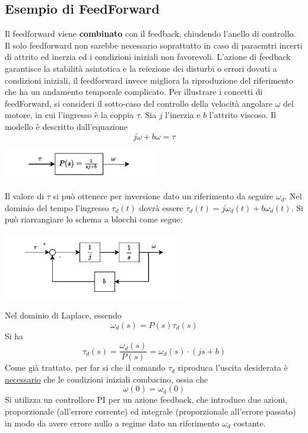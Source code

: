 \documentclass[10pt, letterpaper]{report}
\begin{document}
\subsection{Esempio di FeedForward}
Il feedforward viene \textbf{combinato} con il feedback, chiudendo l'anello di controllo. Il solo feedforward non sarebbe necessario soprattutto in caso di paraemtri incerti di attrito ed inerzia ed i condizioni iniziali non favorevoli.
\acc 
L'azione di feedback garantisce la stabilità asintotica e la reiezione dei disturbi o errori dovuti a condizioni iniziali, il feedforward invece migliora la riproduzione del riferimento che ha un andamento temporale complicato.\acc 
Per illustrare i concetti di feedForward, si consideri il sotto-caso del controllo della velocità angolare $\omega$ del motore, in cui l'ingresso è la coppia $\tau$. Sia $j$ l'inerzia e $b$ l'attrito viscoso. Il modello è descritto dall'equazione $$j\dot\omega+b\omega=\tau $$
\begin{center}
    \includegraphics[width=0.5\textwidth ]{images/modelloMecc.pdf}
\end{center}
Il valore di $\tau$ si può ottenere per inversione dato un riferimento da seguire $\omega_d$. Nel dominio del tempo l'ingresso $\tau_d(t)$ dovrà essere
$\tau_d(t)=j\dot\omega_d(t)+b\omega_d(t)$. Si può riarrangiare lo schema a blocchi come segue:
\begin{center}
    \includegraphics[width=0.6\textwidth ]{images/modelloMecc2.pdf}
\end{center}
Nel dominio di Laplace, essendo 
$$ \omega_d(s)=P(s)\tau_d(s)$$
Si ha 
$$ \tau_d(s)=\frac{\omega_d(s)}{P(s)}=\omega_d(s)\cdot (js+b)$$
Come già trattato, per far si che il comando $\tau_d$ riproduca l'uscita desiderata è \underline{necessario} che le condizioni iniziali combacino, ossia che $$ \omega(0)=\omega_d(0)$$
Si utilizza un controllore PI per un azione feedback, che introduce due azioni, proporzionale (all'errore corrente) ed integrale (proporzionale all'errore passato) in modo da avere errore nullo a regime dato un riferimento $\omega_d$ costante. 
\end{document}
